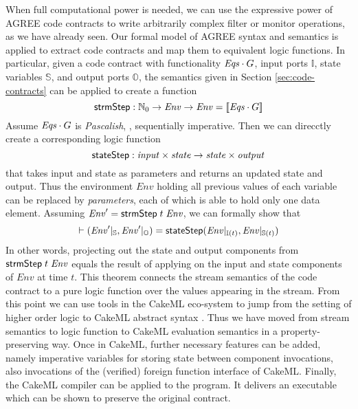 When full computational power is needed, we can use the expressive
power of AGREE code contracts to write arbitrarily complex filter or
monitor operations, as we have already seen. Our formal model of AGREE
syntax and semantics is applied to extract code contracts and map them
to equivalent logic functions. In particular, given a code contract with
functionality ${\mathit{Eqs}}\cdot G$, input ports $\mathbb{I}$, state
variables $\mathbb{S}$, and output ports $\mathbb{O}$, the semantics
given in Section \ref{sec:code-contracts} can be applied to create a
function
\[
 \mathsf{strmStep} : \mathbb{N}_0 \to \mathit{Env} \to \mathit{Env} = [\![ {\mathit{Eqs}}\cdot G ]\!]
\]
Assume ${\mathit{Eqs}}\cdot G$ is \emph{Pascalish}, \ie, sequentially
imperative. Then we can direcctly create a corresponding logic function
\[
\mathsf{stateStep} : \mathit{input} \times \mathit{state} \to \mathit{state} \times \mathit{output}
\]
that takes input and state as parameters and returns an updated state
and output. Thus the environment $\mathit{Env}$ holding all previous
values of each variable can be replaced by \emph{parameters}, each of
which is able to hold only one data element. Assuming
$\mathit{Env}' = \mathsf{strmStep}\;t\; \mathit{Env}$, we can formally show that
\[
\vdash (\mathit{Env}' \vert_{\mathbb{S}},
 \mathit{Env}' \vert_{\mathbb{O}}) =
\mathsf{stateStep} (\mathit{Env}\vert_{\mathbb{I}(t)},
                   \mathit{Env}\vert_{\mathbb{S}(t)})
\]
In other words, projecting out the state and output components from
$\mathsf{strmStep}\;t\; \mathit{Env}$ equals the result of
applying  on the input and state components of
$\mathit{Env}$ at time $t$. This theorem connects the stream semantics
of the code contract to a pure logic function over the values
appearing in the stream. From this point we can use tools in the
CakeML eco-system to jump from the setting of higher order logic to
CakeML abstract syntax \cite{cakeml-translator}. Thus we have moved
from stream semantics to logic function to CakeML evaluation semantics
in a property-preserving way. Once in CakeML, further necessary
features can be added, namely imperative variables for storing state
between component invocations, also invocations of the (verified) foreign
function interface of CakeML. Finally, the CakeML compiler can be
applied to the program. It delivers an executable which can be shown
to preserve the original contract.



